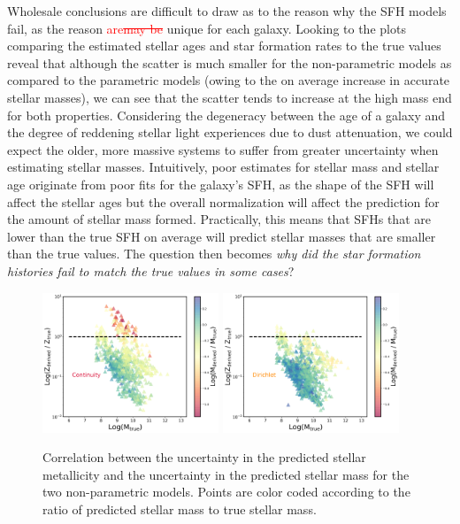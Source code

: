 \documentclass[twocolumn]{aastex62}
\newcommand{\red}[1]{{\textcolor{red}{#1}}}
\begin{document}
Wholesale conclusions are difficult to draw as to the reason why the SFH models fail, as the reason \red{are\sout{may be}} unique for each galaxy. Looking to the plots comparing the estimated stellar ages and star formation rates to the true values reveal that although the scatter is much smaller for the non-parametric models as compared to the parametric models (owing to the on average increase in accurate stellar masses), we can see that the scatter tends to increase at the high mass end for both properties. Considering the degeneracy between the age of a galaxy and the degree of reddening stellar light experiences due to dust attenuation, we could expect the older, more massive systems to suffer from greater uncertainty when estimating stellar masses. Intuitively, poor estimates for stellar mass and stellar age originate from poor fits for the galaxy's SFH, as the shape of the SFH will affect the stellar ages but the overall normalization will affect the prediction for the amount of stellar mass formed. Practically, this means that SFHs that are lower than the true SFH on average will predict stellar masses that are smaller than the true values. The question then becomes \textit{why did the star formation histories fail to match the true values in some cases}? 

\begin{figure}[h!]

\centering
\includegraphics[width=0.47\textwidth]{Zratio_cont.png}\hfill
\includegraphics[width=0.47\textwidth]{Zratio_dir.png}

\caption{Correlation between the uncertainty in the predicted stellar metallicity and the uncertainty in the predicted stellar mass for the two non-parametric models. Points are color coded according to the ratio of predicted stellar mass to true stellar mass.}
\label{fig:zratio}
\end{figure}
\end{document}
